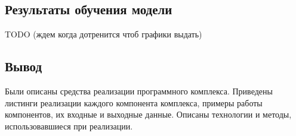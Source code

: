 \subsection{Результаты обучения модели}

TODO (ждем когда дотренится чтоб графики выдать)

\subsection*{Вывод}

Были описаны средства реализации программного комплекса. Приведены листинги реализации каждого компонента комплекса, примеры работы компонентов, их входные и выходные данные. Описаны технологии и методы, использовавшиеся при реализации.